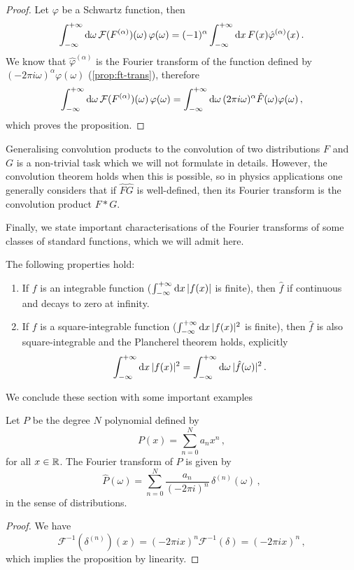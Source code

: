 \begin{proof}
	Let $\varphi$ be a Schwartz function, then
	\begin{equation}
		\int_{-\infty}^{+\infty}\mathrm{d}{\omega}\,\mathcal{F}(F^{(\alpha)})(\omega)\,\varphi(\omega)
		=(-1)^{\alpha}\int_{-\infty}^{+\infty}\mathrm{d}{x}\,F(x)\hat{\varphi}^{(\alpha)}(x)\,.
	\end{equation}
	We know that $\hat{\varphi}^{(\alpha)}$ is the Fourier transform
	of the function defined
	by $(-2\pi i\omega)^\alpha\varphi(\omega)$ (\cf\cref{prop:ft-trans}), therefore
	\begin{equation}
		\int_{-\infty}^{+\infty}\mathrm{d}{\omega}\,\mathcal{F}(F^{(\alpha)})(\omega)\,\varphi(\omega)=
		\int_{-\infty}^{+\infty}\mathrm{d}{\omega}\,(2\pi i\omega)^\alpha\hat{F}(\omega)\varphi(\omega)\,,
	\end{equation}
	which proves the proposition.
\end{proof}
Generalising convolution products to the convolution of two distributions $F$ and $G$ is a
non-trivial task which we will not formulate in details. However, the convolution theorem
holds when this is possible, so in physics applications one generally considers that if
$\hat{F}\hat{G}$ is well-defined, then its Fourier transform is the convolution product
$F\ast G$.

Finally, we state important characterisations of the Fourier transforms of some classes
of standard functions, which we will admit here.
\begin{theorem}
	The following properties hold:
	\begin{enumerate}
		\item If $f$ is an integrable function (\ie $\int_{-\infty}^{+\infty}\mathrm{d}{x}\,|f(x)|$ is finite), then $\hat{f}$ if
		      continuous and decays to zero at infinity.
		\item If $f$ is a square-integrable function (\ie $\int_{-\infty}^{+\infty}\mathrm{d}{x}\,|f(x)|^2$ is finite), then $\hat{f}$
		      is also square-integrable and the Plancherel theorem holds, explicitly
		      \begin{equation}
			      \int_{-\infty}^{+\infty}\mathrm{d}{x}\,|f(x)|^2=\int_{-\infty}^{+\infty}\mathrm{d}{\omega}\,|\hat{f}(\omega)|^2\,.
		      \end{equation}
	\end{enumerate}
\end{theorem}
We conclude these section with some important examples
\begin{proposition}
	Let $P$ be the degree $N$ polynomial defined by
	\begin{equation}
		P(x)=\sum_{n=0}^Na_nx^n\,,
	\end{equation}
	for all $x\in\mathbb{R}$. The Fourier transform of $P$ is given by
	\begin{equation}
		\hat{P}(\omega)=\sum_{n=0}^N\frac{a_n}{(-2\pi i)^n}\,\delta^{(n)}(\omega)\,,
	\end{equation}
	in the sense of distributions.
\end{proposition}
\begin{proof}
	We have
	\begin{equation}
		\mathcal{F}^{-1}(\delta^{(n)})(x)=(-2\pi i x)^n\mathcal{F}^{-1}(\delta)=
		(-2\pi i x)^n\,,
	\end{equation}
	which implies the proposition by linearity.
\end{proof}
